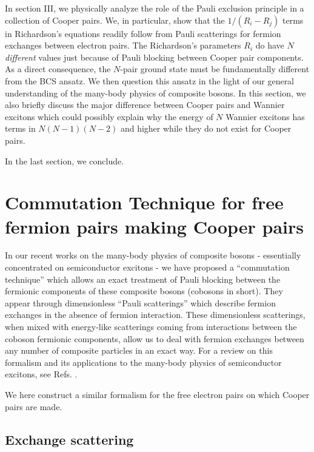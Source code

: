 \documentclass[epj]{svjour}
\begin{document}
In section III,  we physically analyze the role of the Pauli exclusion principle in a collection of Cooper pairs. We, in particular, show that the $1/(R_i-R_j)$ terms in Richardson's equations readily follow
from Pauli scatterings for fermion exchanges 
between electron pairs. The Richardson's parameters $R_i$  do have $N$ \emph{different} values just because 
of Pauli blocking between Cooper pair components. As a direct consequence, the $N$-pair ground state must be fundamentally different from the BCS ansatz. We then question this ansatz in the light of our general understanding of the many-body physics of composite bosons. In this section, we also briefly discuss the major difference between Cooper pairs and Wannier excitons which could possibly explain why the energy of $N$ Wannier excitons has terms in $N(N-1)(N-2)$ and higher while they do not exist for Cooper pairs.

In the last section, we conclude.








\section{Commutation Technique for free fermion pairs making Cooper pairs\label{sec:beta}}

In our recent works on the many-body physics of composite bosons - essentially concentrated on semiconductor excitons - we have
proposed a ``commutation technique'' which allows an exact treatment of Pauli blocking between the fermionic components of these composite
bosons (cobosons in short). They appear through dimensionless ``Pauli scatterings'' which describe fermion
exchanges in the absence of fermion interaction. These dimensionless
scatterings, when mixed with energy-like scatterings coming from interactions
between the coboson fermionic components, allow us to deal with fermion exchanges
between any number of composite particles in an exact way. For a review on
this formalism and its applications to the many-body physics of
semiconductor excitons, see Refs. \cite%
{CobosonPhysicsReports}.

We here construct a similar formalism for the free electron pairs on which Cooper pairs are made.


\subsection{Exchange scattering}
\end{document}
